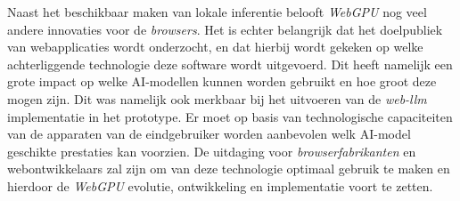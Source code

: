 Naast het beschikbaar maken van lokale inferentie belooft \textit{WebGPU} nog veel andere innovaties voor de \textit{browsers}. Het is echter belangrijk dat het doelpubliek van webapplicaties wordt onderzocht, en dat hierbij wordt gekeken op welke achterliggende technologie deze software wordt uitgevoerd. Dit heeft namelijk een grote impact op welke AI-modellen kunnen worden gebruikt en hoe groot deze mogen zijn. Dit was namelijk ook merkbaar bij het uitvoeren van de \textit{web-llm} implementatie in het prototype. Er moet op basis van technologische capaciteiten van de apparaten van de eindgebruiker worden aanbevolen welk AI-model geschikte prestaties kan voorzien. De uitdaging voor \textit{browserfabrikanten} en web\-on\-twi\-kke\-laars zal zijn om van deze technologie optimaal gebruik te maken en hierdoor de \textit{WebGPU} evolutie, ontwikkeling en implementatie voort te zetten.